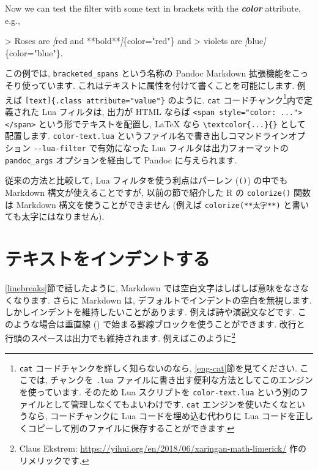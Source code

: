 \documentclass[
  11pt,
  lualatex,
  ja=standard]{bxjsreport}
\newenvironment{Shaded}{\begin{snugshade}}{\end{snugshade}}
\newcommand{\AttributeTok}[1]{\textcolor[rgb]{0.77,0.63,0.00}{#1}}
\newcommand{\CommentTok}[1]{\textcolor[rgb]{0.56,0.35,0.01}{\textit{#1}}}
\newcommand{\InformationTok}[1]{\textcolor[rgb]{0.56,0.35,0.01}{\textbf{\textit{#1}}}}
\newcommand{\NormalTok}[1]{#1}
\newcommand{\OtherTok}[1]{\textcolor[rgb]{0.56,0.35,0.01}{#1}}
\begin{document}
\begin{Shaded}
\begin{Highlighting}[]
\NormalTok{Now we can test the filter with some text in brackets with}
\NormalTok{the }\InformationTok{\textasciigrave{}color\textasciigrave{}}\NormalTok{ attribute, e.g.,}

\AttributeTok{\textgreater{} Roses are }\CommentTok{[}\OtherTok{red and **bold**}\CommentTok{]}\AttributeTok{\{color="red"\} and}
\AttributeTok{\textgreater{} violets are }\CommentTok{[}\OtherTok{blue}\CommentTok{]}\AttributeTok{\{color="blue"\}.}
\end{Highlighting}
\end{Shaded}

この例では, \texttt{bracketed\_spans} という名称の Pandoc Markdown 拡張機能をこっそり使っています. これはテキストに属性を付けて書くことを可能にします. 例えば \texttt{{[}text{]}\{.class\ attribute="value"\}} のように. \texttt{cat} コードチャンク\footnote{\texttt{cat} コードチャンクを詳しく知らないのなら, \ref{eng-cat}節を見てください. ここでは, チャンクを \texttt{.lua} ファイルに書き出す便利な方法としてこのエンジンを使っています. そのため Lua スクリプトを \texttt{color-text.lua} という別のファイルとして管理しなくてもよいわけです. \texttt{cat} エンジンを使いたくなというなら, コードチャンクに Lua コードを埋め込む代わりに Lua コードを正しくコピーして別のファイルに保存することができます.}内で定義された Lua フィルタは, 出力が HTML ならば \texttt{\textless{}span\ style="color:\ ..."\textgreater{}\textless{}/span\textgreater{}} という形でテキストを配置し, LaTeX なら \texttt{\textbackslash{}textcolor\{...\}\{\}} として配置します. \texttt{color-text.lua} というファイル名で書き出しコマンドラインオプション \texttt{-\/-lua-filter} で有効になった Lua フィルタは出力フォーマットの \texttt{pandoc\_args} オプションを経由して Pandoc に与えられます.

従来の方法と比較して, Lua フィルタを使う利点はパーレン (\texttt{()}) の中でも Markdown 構文が使えることですが, 以前の節で紹介した R の \texttt{colorize()} 関数は Markdown 構文を使うことができません (例えば \texttt{colorize(\textquotesingle{}**太字**\textquotesingle{})} と書いても太字にはなりません).

\hypertarget{indent-text}{%
\section{テキストをインデントする}\label{indent-text}}

\ref{linebreaks}節で話したように, Markdown では空白文字はしばしば意味をなさなくなります. さらに Markdown は, デフォルトでインデントの空白を無視します. しかしインデントを維持したいことがあります. 例えば詩や演説文などです. このような場合は垂直線 (\texttt{\textbar{}}) で始まる罫線ブロックを使うことができます. 改行と行頭のスペースは出力でも維持されます. 例えばこのように\footnote{Claus Ekstrøm: \url{https://yihui.org/en/2018/06/xaringan-math-limerick/} 作のリメリックです.}
\end{document}
